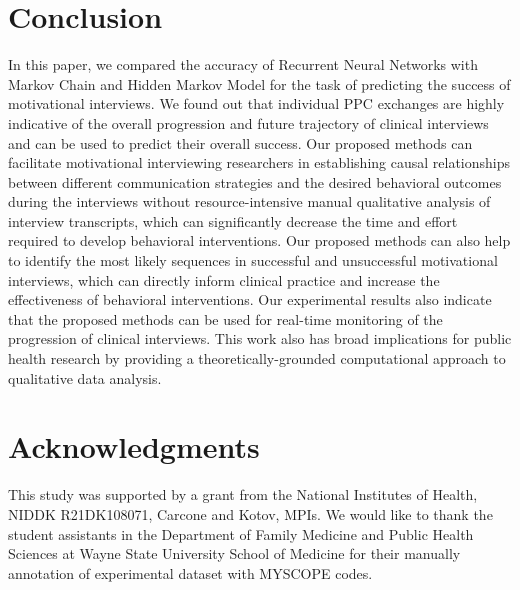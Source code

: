 \documentclass{amia_summit_2018}
\begin{document}
\section*{Conclusion}
In this paper, we compared the accuracy of Recurrent Neural Networks with Markov Chain and Hidden Markov Model for the task of predicting the success of motivational interviews. We found out that individual PPC exchanges are highly indicative of the overall progression and future trajectory of clinical interviews and can be used to predict their overall success. Our proposed methods can facilitate motivational interviewing researchers in establishing causal relationships between different communication strategies and the desired behavioral outcomes during the interviews without resource-intensive manual qualitative analysis of interview transcripts, which can significantly decrease the time and effort required to develop behavioral interventions. Our proposed methods can also help to identify the most likely sequences in successful and unsuccessful motivational interviews, which can directly inform clinical practice and increase the effectiveness of behavioral interventions. Our experimental results also indicate that the proposed methods can be used for real-time monitoring of the progression of clinical interviews. This work also has broad implications for public health research by providing a theoretically-grounded computational approach to qualitative data analysis.

\section*{Acknowledgments}
This study was supported by a grant from the National Institutes of Health, NIDDK R21DK108071, Carcone and Kotov, MPIs. We would like to thank the student assistants in the Department of Family Medicine and Public Health Sciences at Wayne State University School of Medicine for their manually annotation of experimental dataset with MYSCOPE codes. 




\end{document}
